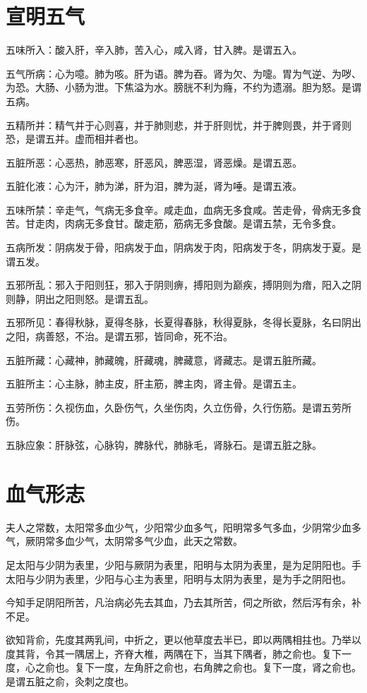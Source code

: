 \documentclass{article}%
\begin{document}
\section{宣明五气}
五味所入：酸入肝，辛入肺，苦入心，咸入肾，甘入脾。是谓五入。

五气所病：心为噫。肺为咳。肝为语。脾为吞。肾为欠、为嚏。胃为气逆、为哕、为恐。大肠、小肠为泄。下焦溢为水。膀胱不利为癃，不约为遗溺。胆为怒。是谓五病。

五精所并：精气并于心则喜，并于肺则悲，并于肝则忧，并于脾则畏，并于肾则恐，是谓五并。虚而相并者也。

五脏所恶：心恶热，肺恶寒，肝恶风，脾恶湿，肾恶燥。是谓五恶。

五脏化液：心为汗，肺为涕，肝为泪，脾为涎，肾为唾。是谓五液。

五味所禁：辛走气，气病无多食辛。咸走血，血病无多食咸。苦走骨，骨病无多食苦。甘走肉，肉病无多食甘。酸走筋，筋病无多食酸。是谓五禁，无令多食。

五病所发：阴病发于骨，阳病发于血，阴病发于肉，阳病发于冬，阴病发于夏。是谓五发。

五邪所乱：邪入于阳则狂，邪入于阴则痹，搏阳则为巅疾，搏阴则为瘖，阳入之阴则静，阴出之阳则怒。是谓五乱。

五邪所见：春得秋脉，夏得冬脉，长夏得春脉，秋得夏脉，冬得长夏脉，名曰阴出之阳，病善怒，不治。是谓五邪，皆同命，死不治。

五脏所藏：心藏神，肺藏魄，肝藏魂，脾藏意，肾藏志。是谓五脏所藏。

五脏所主：心主脉，肺主皮，肝主筋，脾主肉，肾主骨。是谓五主。

五劳所伤：久视伤血，久卧伤气，久坐伤肉，久立伤骨，久行伤筋。是谓五劳所伤。

五脉应象：肝脉弦，心脉钩，脾脉代，肺脉毛，肾脉石。是谓五脏之脉。
\section{血气形志}
夫人之常数，太阳常多血少气，少阳常少血多气，阳明常多气多血，少阴常少血多气，厥阴常多血少气，太阴常多气少血，此天之常数。

足太阳与少阴为表里，少阳与厥阴为表里，阳明与太阴为表里，是为足阴阳也。手太阳与少阴为表里，少阳与心主为表里，阳明与太阴为表里，是为手之阴阳也。

今知手足阴阳所苦，凡治病必先去其血，乃去其所苦，伺之所欲，然后泻有余，补不足。

欲知背俞，先度其两乳间，中折之，更以他草度去半已，即以两隅相拄也。乃举以度其背，令其一隅居上，齐脊大椎，两隅在下，当其下隅者，肺之俞也。复下一度，心之俞也。复下一度，左角肝之俞也，右角脾之俞也。复下一度，肾之俞也。是谓五脏之俞，灸刺之度也。
\end{document}

